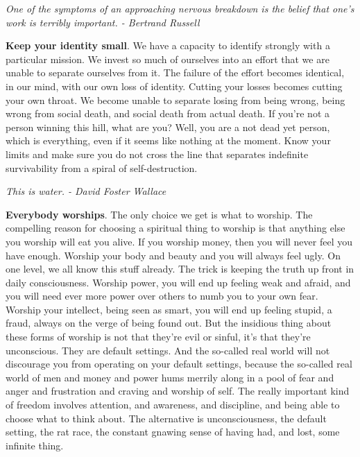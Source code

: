 \documentclass[a4paper,hidelinks]{article}
\begin{document}
\newpage

\begin{center}
\textit{
One of the symptoms of an approaching nervous breakdown is the belief that one's work is terribly important. - Bertrand Russell
}
\end{center}

\textbf{Keep your identity small}.
We have a capacity to identify strongly with a particular mission.
We invest so much of ourselves into an effort that we are unable to separate ourselves from it.
The failure of the effort becomes identical, in our mind, with our own loss of identity.
Cutting your losses becomes cutting your own throat.
We become unable to separate losing from being wrong, being wrong from social death, and social death from actual death.
If you're not a person winning this hill, what are you?
Well, you are a not dead yet person, which is everything, even if it seems like nothing at the moment.
Know your limits and make sure you do not cross the line that separates indefinite survivability from a spiral of self-destruction.

\newpage

\begin{center}
\textit{
This is water. - David Foster Wallace
}
\end{center}

\textbf{Everybody worships}.
The only choice we get is what to worship.
The compelling reason for choosing a spiritual thing to worship is that anything else you worship will eat you alive.
If you worship money, then you will never feel you have enough.
Worship your body and beauty and you will always feel ugly.
On one level, we all know this stuff already.
The trick is keeping the truth up front in daily consciousness.
Worship power, you will end up feeling weak and afraid, and you will need ever more power over others to numb you to your own fear.
Worship your intellect, being seen as smart, you will end up feeling stupid, a fraud, always on the verge of being found out.
But the insidious thing about these forms of worship is not that they’re evil or sinful, it’s that they’re unconscious.
They are default settings.
And the so-called real world will not discourage you from operating on your default settings, because the so-called real world of men and money and power hums merrily along in a pool of fear and anger and frustration and craving and worship of self.
The really important kind of freedom involves attention, and awareness, and discipline, and being able to choose what to think about.
The alternative is unconsciousness, the default setting, the rat race, the constant gnawing sense of having had, and lost, some infinite thing.
\end{document}
